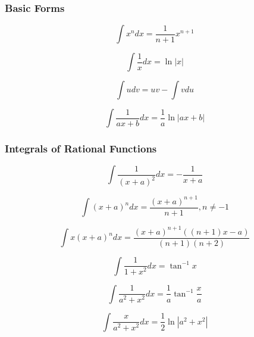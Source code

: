 \documentclass[11pt, letterpaper, notitlepage]{article}
\begin{document}
\begin{multicols}{2}

\begin{footnotesize}
\subsubsection{Basic Forms}

\begin{equation}
\int x^n dx = \frac{1}{n+1}x^{n+1}
\end{equation}

\begin{equation}
\int \frac{1}{x}dx = \ln |x|
\end{equation}

\begin{equation}
\int u dv = uv - \int v du
\end{equation}

\begin{equation}
\int \frac{1}{ax+b}dx = \frac{1}{a} \ln |ax + b| 
\end{equation}

\subsubsection{Integrals of Rational Functions}

\begin{equation}
\int \frac{1}{(x+a)^2}dx = -\frac{1}{x+a}
\end{equation}

\begin{equation}
\int (x+a)^n dx = \frac{(x+a)^{n+1}}{n+1}, n\ne -1
\end{equation}

\begin{equation}
\int x(x+a)^n dx = \frac{(x+a)^{n+1} ( (n+1)x-a)}{(n+1)(n+2)}
\end{equation}

\begin{equation}
\int \frac{1}{1+x^2}dx = \tan^{-1}x
\end{equation}

\begin{equation}
\int \frac{1}{a^2+x^2}dx = \frac{1}{a}\tan^{-1}\frac{x}{a}
\end{equation}

\begin{equation}
\int \frac{x}{a^2+x^2}dx = \frac{1}{2}\ln|a^2+x^2|
\end{equation}


\end{footnotesize}
\end{multicols}
\end{document}
